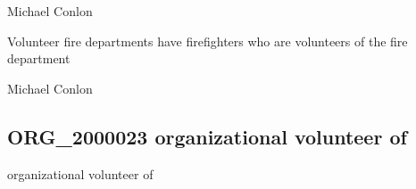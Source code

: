 \documentclass[letterpaper,10pt,english]{sphinxmanual}
\begin{document}
\begin{sphinxShadowBox}

\sphinxAtStartPar
Michael Conlon 
\end{sphinxShadowBox}

\begin{sphinxShadowBox}

\sphinxAtStartPar
{\hyperref[\detokenize{doc-ORG_0000001::doc}]{}}
\end{sphinxShadowBox}

\begin{sphinxShadowBox}

\sphinxAtStartPar
{\hyperref[\detokenize{doc-NCBITaxon_9606::doc}]{}}
\end{sphinxShadowBox}

\begin{sphinxShadowBox}

\sphinxAtStartPar
{\hyperref[\detokenize{doc-ORG_2000023::doc}]{}}
\end{sphinxShadowBox}

\begin{sphinxShadowBox}

\sphinxAtStartPar
Volunteer fire departments have firefighters who are volunteers of the fire department
\end{sphinxShadowBox}

\begin{sphinxShadowBox}

\sphinxAtStartPar
Michael Conlon 
\end{sphinxShadowBox}
\begin{quote}

\ignorespaces \end{quote}


\subsection{ORG\_2000023 \sphinxhyphen{} organizational volunteer of}
\label{\detokenize{doc-ORG_2000023:org-2000023-organizational-volunteer-of}}\label{\detokenize{doc-ORG_2000023:index-0}}\label{\detokenize{doc-ORG_2000023::doc}}
\begin{sphinxShadowBox}

\sphinxAtStartPar
organizational volunteer of
\end{sphinxShadowBox}
\end{document}
